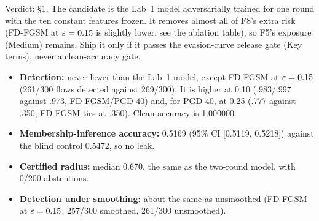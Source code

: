  Verdict: \S1. The candidate is the Lab~1 model adversarially trained for one round with the ten constant features frozen. It removes almost all of F8's extra risk (FD-FGSM at $\varepsilon=0.15$ is slightly lower, see the ablation table), so F5's exposure (Medium) remains. Ship it only if it passes the evasion-curve release gate (Key terms), never a clean-accuracy gate.
\begin{itemize}
\item \textbf{Detection:} never lower than the Lab~1 model, except FD-FGSM at $\varepsilon=0.15$ (261/300 flows detected against 269/300). It is higher at 0.10 (.983/.997 against .973, FD-FGSM/PGD-40) and, for PGD-40, at 0.25 (.777 against .350; FD-FGSM ties at .350). Clean accuracy is 1.000000.
\item \textbf{Membership-inference accuracy:} 0.5169 (95\% CI [0.5119, 0.5218]) against the blind control 0.5472, so no leak.
\item \textbf{Certified radius:} median 0.670, the same as the two-round model, with 0/200 abstentions.
\item \textbf{Detection under smoothing:} about the same as unsmoothed (FD-FGSM at $\varepsilon=0.15$: 257/300 smoothed, 261/300 unsmoothed).
\end{itemize}
